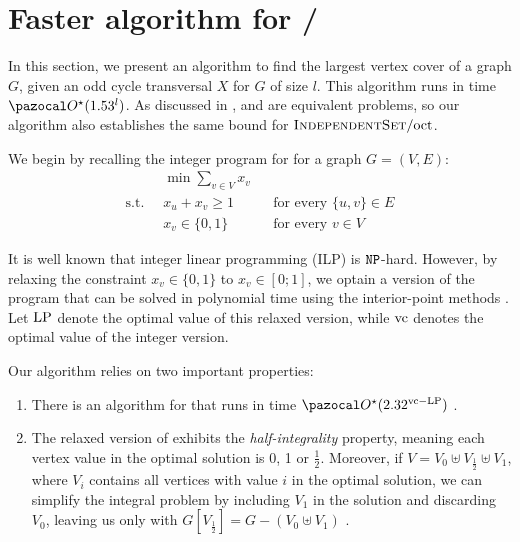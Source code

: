 \section{Faster algorithm for /\oct}
\label{section:indset-oct}

In this section, we present an algorithm to find the largest vertex cover of a graph $G$, given an odd cycle transversal $X$ for $G$ of size $l$. This algorithm runs in time $\O^\star(1.53^l)$. As discussed in ,  and  are equivalent problems, so our algorithm also establishes the same bound for $\textsc{IndependentSet}/\text{oct}$.

\medskip

We begin by recalling the integer program for  for a graph $G = (V, E)$:
\begin{align*}
    &\min \sum_{v \in V} x_v\\
    \text{s.t.}\;\; & x_u + x_v \geq 1 &&\text{for every } \{u,v\} \in E\\
    & x_v \in \{0,1\} &&\text{for every } v \in V
\end{align*}
    
It is well known that integer linear programming (ILP) is $\texttt{NP}$-hard. However, by relaxing the constraint $x_v \in \{0, 1\}$ to $x_v \in [0; 1]$, we optain a version of the program that can be solved in polynomial time using the interior-point methods \cite{karmarkar1984new}. Let $\text{LP}$ denote the optimal value of this relaxed version, while $\text{vc}$ denotes the optimal value of the integer version.

\medskip

Our algorithm relies on two important properties:
\begin{enumerate}
    \item There is an algorithm for  that runs in time $\O^\star(2.32^{\vc - \LP})$ \cite{lokshtanov2014faster}.
    \item The relaxed version of  exhibits the \textit{half-integrality} property, meaning each vertex value in the optimal solution is 0, 1 or $\frac{1}{2}$. Moreover, if $V = V_0 \uplus V_{\frac{1}{2}} \uplus V_1$, where $V_i$ contains all vertices with value $i$ in the optimal solution, we can simplify the integral  problem by including $V_1$ in the solution and discarding $V_0$, leaving us only with $G[V_{\frac{1}{2}}] = G - (V_0 \uplus V_1)$ \cite{nemhauser1975vertex}.
\end{enumerate}

